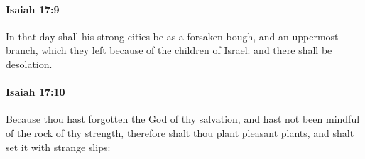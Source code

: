 		\paragraph{Isaiah 17:9} %
			\label{ISAIAH-17-9}

			In that day shall his strong cities be as a forsaken bough, and an uppermost branch, which they left because of the children of Israel: and there shall be desolation.


		\paragraph{Isaiah 17:10} %
			\label{ISAIAH-17-10}

			Because thou hast forgotten the God of thy salvation, and hast not been mindful of the rock of thy strength, therefore shalt thou plant pleasant plants, and shalt set it with strange slips:


